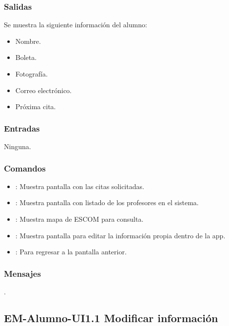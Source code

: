 \subsubsection{Salidas}
	\noindent
	Se muestra la siguiente información del alumno:
	\begin{itemize}
		\item Nombre.
		\item Boleta.
		\item Fotografía.
		\item Correo electrónico.
		\item Próxima cita. 
	\end{itemize}

\subsubsection{Entradas}
	\noindent
	Ninguna.

\subsubsection{Comandos}
\begin{itemize}
	\item {}: Muestra pantalla con las citas solicitadas.
	\item {}: Muestra pantalla con listado de los profesores en el sistema.
	\item {}: Muestra mapa de ESCOM para consulta.
	\item {}: Muestra pantalla para editar la información propia dentro de la app.
	\item {}: Para regresar a la pantalla anterior.
\end{itemize}

\subsubsection{Mensajes}
	\noindent.




\pagebreak
\subsection{EM-Alumno-UI1.1 Modificar información}

